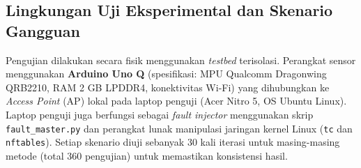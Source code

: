 \subsection{Lingkungan Uji Eksperimental dan Skenario Gangguan}
Pengujian dilakukan secara fisik menggunakan \textit{testbed} terisolasi. Perangkat sensor menggunakan \textbf{Arduino Uno Q} (spesifikasi: MPU Qualcomm Dragonwing QRB2210, RAM 2 GB LPDDR4, konektivitas Wi-Fi) yang dihubungkan ke \textit{Access Point} (AP) lokal pada laptop penguji (Acer Nitro 5, OS Ubuntu Linux). Laptop penguji juga berfungsi sebagai \textit{fault injector} menggunakan skrip \texttt{fault\_master.py} dan perangkat lunak manipulasi jaringan kernel Linux (\texttt{tc} dan \texttt{nftables}). Setiap skenario diuji sebanyak 30 kali iterasi untuk masing-masing metode (total 360 pengujian) untuk memastikan konsistensi hasil.

